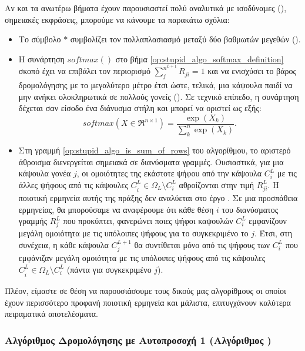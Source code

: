 {\begin{algorithm}[h]
\begin{algorithmic}[1]
  \end{algorithmic}
  \end{algorithm}
}


Αν και τα ανωτέρω βήματα έχουν παρουσιαστεί πολύ αναλυτικά με ισοδύναμες (), σημειακές εκφράσεις, μπορούμε να κάνουμε τα παρακάτω σχόλια:
\begin{itemize}
  \item Το σύμβολο $\ast$ συμβολίζει τον πολλαπλασιασμό μεταξύ δύο βαθμωτών μεγεθών ().
  \item Η συνάρτηση $softmax()$ στο βήμα \ref{op:stupid_algo_softmax_definition} σκοπό έχει να επιβάλει τον περιορισμό $\sum_j^{n^{L+1}} R_{ji} = 1$ και να ενισχύσει το βάρος δρομολόγησης με το μεγαλύτερο μέτρο έτσι ώστε, τελικά, μια κάψουλα παιδί να μην ανήκει ολοκληρωτικά σε πολλούς γονείς (). Σε τεχνικό επίπεδο, η συνάρτηση δέχεται σαν είσοδο ένα διάνυσμα στήλη και μπορεί να οριστεί ως εξής:
  \begin{equation}
    \label{eq:softmax_algorithm}
    \mathit{softmax}(X \in \Re^{n \times 1}) = \frac{\exp(X_k)}{\sum_k^n \exp(X_k)}.
  \end{equation}
  \item Στη γραμμή \ref{op:stupid_algo_is_sum_of_rows} του αλγορίθμου, το αριστερό άθροισμα διενεργείται σημειακά σε διανύσματα γραμμές. Ουσιαστικά, για μια κάψουλα γονέα $j$, οι ομοιότητες της εκάστοτε ψήφου από την κάψουλα $C_i^L$ με τις άλλες ψήφους από τις κάψουλες $C_{\acute{i}}^L \in \Omega_L \setminus C_i^L$ αθροίζονται στην τιμή $R_{ji}^L$. Η ποιοτική ερμηνεία αυτής της πράξης δεν αναλύεται στο έργο \cite{mazzia2021efficient}. Σε μια προσπάθεια ερμηνείας, θα μπορούσαμε να αναφέρουμε ότι κάθε θέση $i$ του διανύσματος γραμμής $R_j^L$ που προκύπτει, φανερώνει ποιες ψήφοι καψουλών $C_i^L$ εμφανίζουν μεγάλη ομοιότητα με τις υπόλοιπες ψήφους για το συγκεκριμένο το $j$. Έτσι, στη συνέχεια, η κάθε κάψουλα $C_j^{L+1}$ θα συντίθεται μόνο από τις ψήφους των $C_{i}^L$ που εμφάνιζαν μεγάλη ομοιότητα με τις υπόλοιπες ψήφους από τις κάψουλες $C_{\acute{i}}^L \in \Omega_L \setminus C_i^L$ (πάντα για συγκεκριμένο $j$).
\end{itemize}

Πλέον, είμαστε σε θέση να παρουσιάσουμε τους δικούς μας αλγορίθμους οι οποίοι έχουν περισσότερο προφανή ποιοτική ερμηνεία και μάλιστα, επιτυγχάνουν καλύτερα πειραματικά αποτελέσματα.

\subsubsection{Αλγόριθμος Δρομολόγησης με Αυτο\textendash προσοχή 1 (Αλγόριθμος )}

